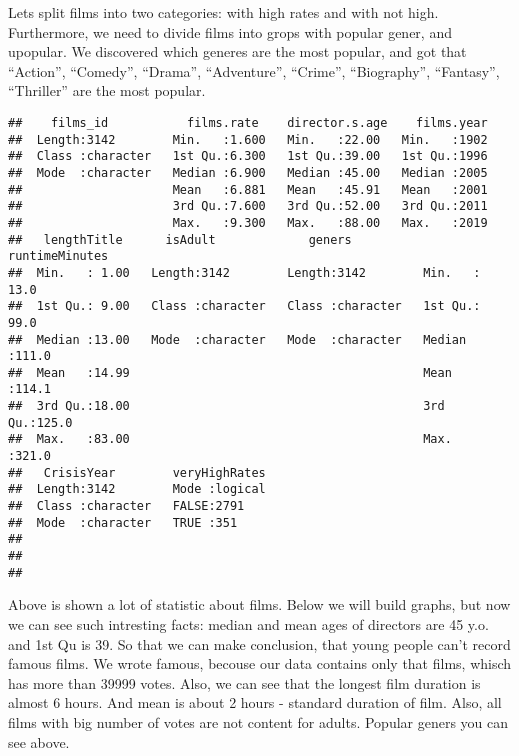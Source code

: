 \documentclass[
]{article}
\newenvironment{Shaded}{\begin{snugshade}}{\end{snugshade}}
\newcommand{\DecValTok}[1]{\textcolor[rgb]{0.00,0.00,0.81}{#1}}
\newcommand{\FunctionTok}[1]{\textcolor[rgb]{0.00,0.00,0.00}{#1}}
\newcommand{\NormalTok}[1]{#1}
\newcommand{\OtherTok}[1]{\textcolor[rgb]{0.56,0.35,0.01}{#1}}
\newcommand{\SpecialCharTok}[1]{\textcolor[rgb]{0.00,0.00,0.00}{#1}}
\begin{document}
Lets split films into two categories: with high rates and with not high.
Furthermore, we need to divide films into grops with popular gener, and
upopular. We discovered which generes are the most popular, and got that
``Action'', ``Comedy'', ``Drama'', ``Adventure'', ``Crime'',
``Biography'', ``Fantasy'', ``Thriller'' are the most popular.

\begin{Shaded}
\end{Shaded}

\begin{verbatim}
##    films_id           films.rate    director.s.age    films.year  
##  Length:3142        Min.   :1.600   Min.   :22.00   Min.   :1902  
##  Class :character   1st Qu.:6.300   1st Qu.:39.00   1st Qu.:1996  
##  Mode  :character   Median :6.900   Median :45.00   Median :2005  
##                     Mean   :6.881   Mean   :45.91   Mean   :2001  
##                     3rd Qu.:7.600   3rd Qu.:52.00   3rd Qu.:2011  
##                     Max.   :9.300   Max.   :88.00   Max.   :2019  
##   lengthTitle      isAdult             geners          runtimeMinutes 
##  Min.   : 1.00   Length:3142        Length:3142        Min.   : 13.0  
##  1st Qu.: 9.00   Class :character   Class :character   1st Qu.: 99.0  
##  Median :13.00   Mode  :character   Mode  :character   Median :111.0  
##  Mean   :14.99                                         Mean   :114.1  
##  3rd Qu.:18.00                                         3rd Qu.:125.0  
##  Max.   :83.00                                         Max.   :321.0  
##   CrisisYear        veryHighRates  
##  Length:3142        Mode :logical  
##  Class :character   FALSE:2791     
##  Mode  :character   TRUE :351      
##                                    
##                                    
## 
\end{verbatim}

Above is shown a lot of statistic about films. Below we will build
graphs, but now we can see such intresting facts: median and mean ages
of directors are 45 y.o. and 1st Qu is 39. So that we can make
conclusion, that young people can't record famous films. We wrote
famous, becouse our data contains only that films, whisch has more than
39999 votes. Also, we can see that the longest film duration is almost 6
hours. And mean is about 2 hours - standard duration of film. Also, all
films with big number of votes are not content for adults. Popular
geners you can see above.
\end{document}
